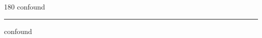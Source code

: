 
\begin{frame}
\begin{center}
\begin{turn}{180}
{\fontsize{2.5cm}{1em}\selectfont confound}
\end{turn}
\vspace{1em}\par  
\hrule
\vspace{1em}\par  
{\fontsize{2.5cm}{1em}\selectfont confound}
\end{center}
\end{frame}
